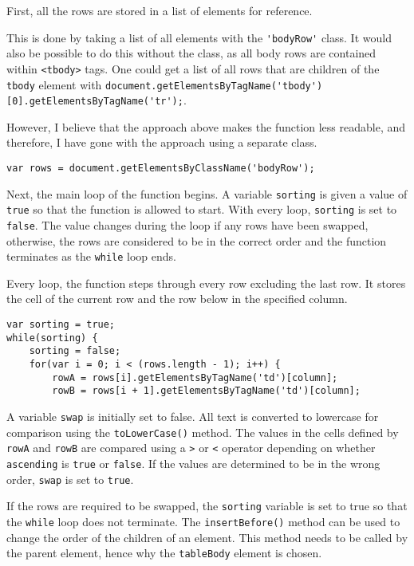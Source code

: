 \documentclass[letterpaper]{article}
\begin{document}
First, all the rows are stored in a list of elements for reference.

This is done by taking a list of all elements with the \lstinline{'bodyRow'} class.
It would also be possible to do this without the class, as all body rows are contained within \lstinline{<tbody>} tags.
One could get a list of all rows that are children of the \lstinline{tbody} element with
\lstinline{document.getElementsByTagName('tbody')[0].getElementsByTagName('tr');}.

However, I believe that the approach above makes the function less readable, and therefore, I have gone with the approach using a separate class.

\begin{lstlisting}[firstnumber=223]
var rows = document.getElementsByClassName('bodyRow');
\end{lstlisting}

Next, the main loop of the function begins.
A variable \lstinline{sorting} is given a value of \lstinline{true} so that the function is allowed to start.
With every loop, \lstinline{sorting} is set to \lstinline{false}.
The value changes during the loop if any rows have been swapped, otherwise, the rows are considered to be in the correct order and the function terminates as the \lstinline{while} loop ends.

Every loop, the function steps through every row excluding the last row.
It stores the cell of the current row and the row below in the specified column.

\begin{lstlisting}[firstnumber=225]
var sorting = true;
while(sorting) {
    sorting = false;
    for(var i = 0; i < (rows.length - 1); i++) {
        rowA = rows[i].getElementsByTagName('td')[column];
        rowB = rows[i + 1].getElementsByTagName('td')[column];
\end{lstlisting}

A variable \lstinline{swap} is initially set to false.
All text is converted to lowercase for comparison using the \lstinline{toLowerCase()} method.
The values in the cells defined by \lstinline{rowA} and \lstinline{rowB} are compared using a \lstinline{>} or \lstinline{<} operator depending on whether \lstinline{ascending} is \lstinline{true} or \lstinline{false}.
If the values are determined to be in the wrong order, \lstinline{swap} is set to \lstinline{true}.

If the rows are required to be swapped, the \lstinline{sorting} variable is set to true so that the \lstinline{while} loop does not terminate.
The \lstinline{insertBefore()} method can be used to change the order of the children of an element.
This method needs to be called by the parent element, hence why the \lstinline{tableBody} element is chosen.
\end{document}
